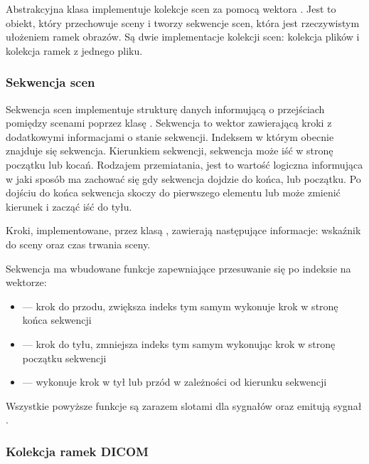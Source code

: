 \label{sec:sokar-scenesets}

Abstrakcyjna klasa  implementuje kolekcje scen za pomocą wektora .
Jest to obiekt, który przechowuje sceny i tworzy sekwencje scen, która jest rzeczywistym ułożeniem ramek obrazów.
Są dwie implementacje kolekcji scen: kolekcja plików i kolekcja ramek z jednego pliku.

\subsubsection{Sekwencja scen}
\label{sec:sokar-scenesequence}

\par
Sekwencja scen implementuje strukturę danych informującą o przejściach pomiędzy scenami poprzez klasę .
Sekwencja to wektor zawierającą kroki z dodatkowymi informacjami o stanie sekwencji.
Indeksem w którym obecnie znajduje się sekwencja.
Kierunkiem sekwencji, sekwencja może iść w stronę początku lub kocań.
Rodzajem przemiatania, jest to wartość logiczna informująca w jaki sposób ma zachować się gdy sekwencja dojdzie do końca, lub początku.
Po dojściu do końca sekwencja skoczy do pierwszego elementu lub może zmienić kierunek i zacząć iść do tyłu.

\par
Kroki, implementowane, przez klasą , zawierają następujące informacje: wskaźnik do sceny oraz czas trwania sceny.

\par
Sekwencja ma wbudowane funkcje zapewniające przesuwanie się po indeksie na wektorze:
\begin{itemize}
    \item {} --- krok do przodu, zwiększa indeks tym samym wykonuje krok w stronę końca sekwencji
    \item {} --- krok do tyłu, zmniejsza indeks tym samym wykonując krok w stronę początku sekwencji
    \item {} --- wykonuje krok w tył lub przód w zależności od kierunku sekwencji
\end{itemize}
Wszystkie powyższe funkcje są zarazem slotami dla sygnałów oraz emitują sygnał .

\subsubsection{Kolekcja ramek DICOM}
\label{sec:sokar-dicomframeset}

